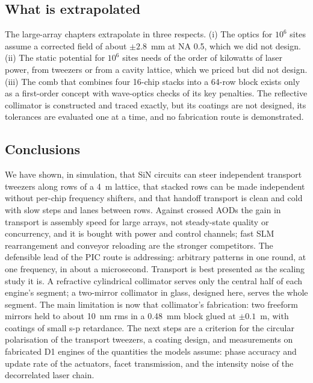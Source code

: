 \subsection{What is extrapolated}\label{sec:discussion-extrap}

The large-array chapters extrapolate in three respects. (i) The optics for $10^6$ sites assume a corrected field
of about $\pm2.8$~mm at NA 0.5, which we did not design. (ii) The static potential for $10^6$ sites needs of the
order of kilowatts of laser power, from tweezers or from a cavity lattice, which we priced but did not
design. (iii) The comb that combines four 16-chip stacks into a 64-row block exists only as a first-order concept with
wave-optics checks of its key penalties. The reflective collimator is constructed and traced exactly, but its
coatings are not designed, its tolerances are evaluated one at a time, and no fabrication route is
demonstrated.

\subsection{Conclusions}\label{sec:discussion-concl}

We have shown, in simulation, that SiN circuits can steer independent transport tweezers along rows of a
4~\textmu m lattice, that stacked rows can be made independent without per-chip frequency shifters, and that
handoff transport is clean and cold with slow steps and lanes between rows. Against crossed AODs the gain in
transport is assembly speed for large arrays, not steady-state quality or concurrency, and it is bought with power and
control channels; fast SLM rearrangement and conveyor reloading are the stronger competitors. The defensible lead of
the PIC route is addressing: arbitrary patterns in one round, at one frequency, in about a microsecond. Transport is
best presented as the scaling study it is. A refractive cylindrical collimator
serves only the central half of each engine's segment; a two-mirror collimator in glass, designed here, serves the
whole segment. The main limitation is now that collimator's fabrication: two freeform mirrors held to about 10~nm
rms in a 0.48~mm block glued at $\pm0.1$~\textmu m, with coatings of small s-p retardance. The next steps are a
criterion for the circular polarisation of the transport tweezers, a coating design, and measurements on
fabricated D1 engines of the quantities the models assume: phase accuracy and update rate of the actuators,
facet transmission, and the intensity noise of the decorrelated laser chain.
